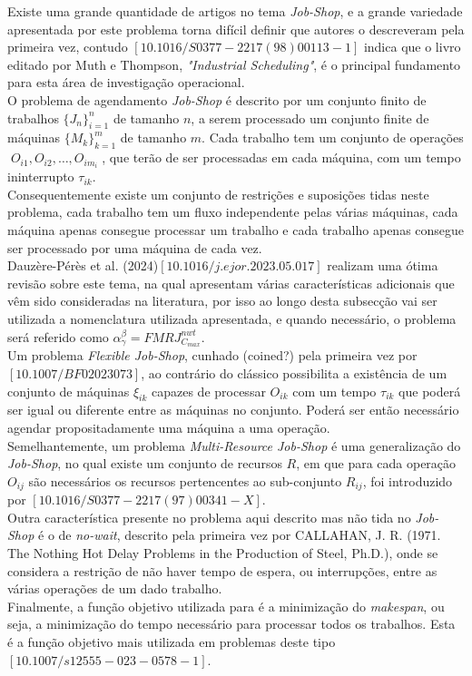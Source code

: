 Existe uma grande quantidade de artigos no tema \textit{Job-Shop}, e a grande variedade apresentada por este problema torna difícil definir que autores o descreveram pela primeira vez, contudo $[10.1016/S0377-2217(98)00113-1]$ indica que o livro editado por Muth e Thompson, \textit{"Industrial Scheduling"}, é o principal fundamento para esta área de investigação operacional.\\
O problema de agendamento \textit{Job-Shop} é descrito por um conjunto finito de trabalhos $\{J_{n}\}^{n}_{i=1}$ de tamanho $n$, a serem processado um conjunto finite de máquinas $\{M_{k}\}^{m}_{k=1}$ de tamanho $m$. Cada trabalho tem um conjunto de operações $\; O_{i1}, O_{i2}, \ldots, O_{im_{i}} \;$, que terão de ser processadas em cada máquina, com um tempo ininterrupto $\tau_{ik}$.\\
Consequentemente existe um conjunto de restrições e suposições tidas neste problema, cada trabalho tem um fluxo independente pelas várias máquinas, cada máquina apenas consegue processar um trabalho e cada trabalho apenas consegue ser processado por uma máquina de cada vez.\\
Dauzère-Pérès et al. (2024)$[10.1016/j.ejor.2023.05.017]$ realizam uma ótima revisão sobre este tema, na qual apresentam várias características adicionais que vêm sido consideradas na literatura, por isso ao longo desta subsecção vai ser utilizada a nomenclatura utilizada apresentada, e quando necessário, o problema será referido como $\alpha^{\beta}_{\gamma} = FMRJ^{nwt}_{C_{max}}$.\\
Um problema \textit{Flexible Job-Shop}, cunhado (coined?) pela primeira vez por $[10.1007/BF02023073]$, ao contrário do clássico possibilita a existência de um conjunto de máquinas $\xi_{ik}$ capazes de processar $O_{ik}$ com um tempo $\tau_{ik}$ que poderá ser igual ou diferente entre as máquinas no conjunto. Poderá ser então necessário agendar propositadamente uma máquina a uma operação.\\
Semelhantemente, um problema \textit{Multi-Resource Job-Shop} é uma generalização do \textit{Job-Shop}, no qual existe um conjunto de recursos $R$, em que para cada operação $O_{ij}$ são necessários os recursos pertencentes ao sub-conjunto $R_{ij}$, foi introduzido por $[10.1016/S0377-2217(97)00341-X]$.\\
Outra característica presente no problema aqui descrito mas não tida no \textit{Job-Shop} é o de \textit{no-wait}, descrito pela primeira vez por CALLAHAN, J. R. (1971. The Nothing Hot Delay Problems in the Production of Steel, Ph.D.), onde se considera a restrição de não haver tempo de espera, ou interrupções, entre as várias operações de um dado trabalho.\\
Finalmente, a função objetivo utilizada para é a minimização do \textit{makespan}, ou seja, a minimização do tempo necessário para processar todos os trabalhos. Esta é a função objetivo mais utilizada em problemas deste tipo $[10.1007/s12555-023-0578-1]$.\\

